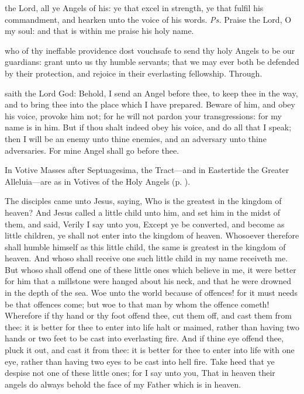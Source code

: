 \introit
{} the Lord, all ye Angels of his: ye that excel in strength, ye that fulfil his commandment, and hearken unto the voice of his words. \textit{Ps.} Praise the Lord, O my soul: and that is within me praise his holy name.

\collect
{} who of thy ineffable providence dost vouchsafe to send thy holy Angels to be our guardians: grant unto us thy humble servants; that we may ever both be defended by their protection, and rejoice in their everlasting fellowship. Through.

 saith the Lord God: Behold, I send an Angel before thee, to keep thee in the way, and to bring thee into the place which I have prepared. Beware of him, and obey his voice, provoke him not; for he will not pardon your transgressions: for my name is in him. But if thou shalt indeed obey his voice, and do all that I speak; then I will be an enemy unto thine enemies, and an adversary unto thine adversaries. For mine Angel shall go before thee.



\begin{rubric}
	In Votive Masses after Septuagesima, the Tract---and in Eastertide the Greater Alleluia---are as in Votives of the Holy Angels (p. \pageref{MassOfTheAngels}).
\end{rubric}

 The disciples came unto Jesus, saying, Who is the greatest in the kingdom of heaven? And Jesus called a little child unto him, and set him in the midst of them, and said, Verily I say unto you, Except ye be converted, and become as little children, ye shall not enter into the kingdom of heaven. Whosoever therefore shall humble himself as this little child, the same is greatest in the kingdom of heaven. And whoso shall receive one such little child in my name receiveth me. But whoso shall offend one of these little ones which believe in me, it were better for him that a millstone were hanged about his neck, and that he were drowned in the depth of the sea. Woe unto the world because of offences! for it must needs be that offences come; but woe to that man by whom the offence cometh! Wherefore if thy hand or thy foot offend thee, cut them off, and cast them from thee: it is better for thee to enter into life halt or maimed, rather than having two hands or two feet to be cast into everlasting fire. And if thine eye offend thee, pluck it out, and cast it from thee: it is better for thee to enter into life with one eye, rather than having two eyes to be cast into hell fire. Take heed that ye despise not one of these little ones; for I say unto you, That in heaven their angels do always behold the face of my Father which is in heaven.


